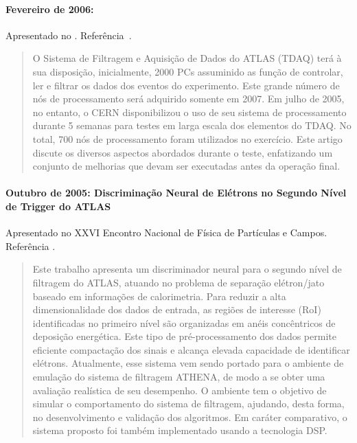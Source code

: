 \paragraph{Fevereiro de 2006: }
Apresentado no . Referência~\cite{aa:chep-06-01}.

\begin{quotation}
O Sistema de Filtragem e Aquisição de Dados do ATLAS (TDAQ) terá à sua
disposição, inicialmente, 2000 PCs assuminido as função de controlar, ler e
filtrar os dados dos eventos do experimento. Este grande número de nós de
processamento será adquirido somente em 2007. Em julho de 2005, no entanto, o
CERN disponibilizou o uso de seu sistema de processamento  durante
5 semanas para testes em larga escala dos elementos do TDAQ. No total, 700 nós
de processamento foram utilizados no exercício. Este artigo discute os
diversos aspectos abordados durante o teste, enfatizando um conjunto de
melhorias que devam ser executadas antes da operação final.
\end{quotation}

\paragraph{Outubro de 2005: Discriminação Neural de Elétrons no Segundo Nível
de Trigger do ATLAS} Apresentado no XXVI Encontro Nacional de Física de
Partículas e Campos. Referência \cite{aa:enfpc-05a}. 

\begin{quotation}
Este trabalho apresenta um discriminador neural para o segundo nível de
filtragem do ATLAS, atuando no problema de separação elétron/jato baseado em
informações de calorimetria. Para reduzir a alta dimensionalidade dos dados de
entrada, as regiões de interesse (RoI) identificadas no primeiro nível são
organizadas em anéis concêntricos de deposição energética. Este tipo de
pré-processamento dos dados permite eficiente compactação dos sinais e alcança
elevada capacidade de identificar elétrons. Atualmente, esse sistema vem sendo
portado para o ambiente de emulação do sistema de filtragem ATHENA, de modo a se
obter uma avaliação realística de seu desempenho. O ambiente tem o objetivo de
simular o comportamento do sistema de filtragem, ajudando, desta forma, no
desenvolvimento e validação dos algoritmos. Em caráter comparativo, o sistema
proposto foi também implementado usando a tecnologia DSP.
\end{quotation}

